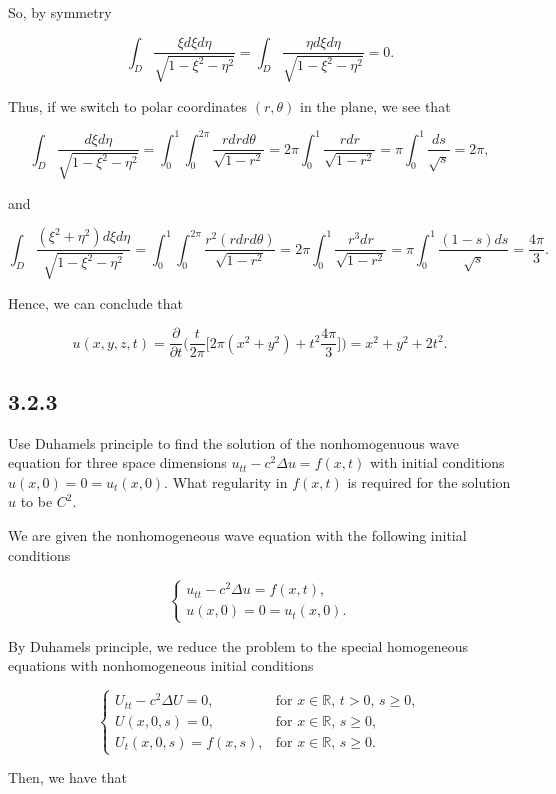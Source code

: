 \documentclass{article}
\begin{document}
So, by symmetry

$$\int_{D}\frac{\xi d\xi d\eta}{\sqrt{1-\xi^2-\eta^2}}=\int_{D}\frac{\eta d\xi d\eta}{\sqrt{1-\xi^2-\eta^2}}=0.$$

Thus, if we switch to polar coordinates $(r,\theta)$ in the plane, we see that

$$\int_{D}\frac{d\xi d\eta}{\sqrt{1-\xi^2-\eta^2}}=\int_0^1\int_0^{2\pi}\frac{rdrd\theta}{\sqrt{1-r^2}}=2\pi\int_0^1\frac{rdr}{\sqrt{1-r^2}}=\pi\int_0^1\frac{ds}{\sqrt{s}}=2\pi,$$

and

$$\int_{D}\frac{(\xi^2+\eta^2) d\xi d\eta}{\sqrt{1-\xi^2-\eta^2}}=\int_0^1\int_0^{2\pi}\frac{r^2(rdrd\theta)}{\sqrt{1-r^2}}=2\pi\int_0^1\frac{r^3dr}{\sqrt{1-r^2}}=\pi\int_0^1\frac{(1-s)ds}{\sqrt{s}}=\frac{4\pi}{3}.$$

Hence, we can conclude that

$$u(x,y,z,t)=\frac{\partial}{\partial t}\Bigg(\frac{t}{2\pi}\Big[2\pi(x^2+y^2)+t^2\frac{4\pi}{3}\Big]\Bigg)=x^2+y^2+2t^2.$$

\subsection{\textbf{3.2.3}} Use Duhamel\textsc{}s principle to find the solution of the nonhomogenuous wave equation for three space dimensions $u_{tt}-c^2\Delta u=f(x,t)$ with initial conditions $u(x,0)=0=u_t(x,0)$. What regularity in $f(x,t)$ is required for the solution $u$ to be $C^2$.

We are given the nonhomogeneous wave equation with the following initial conditions

\[
  \begin{cases}
  u_{tt}-c^2\Delta u=f(x,t), \\
  u(x,0)=0=u_t(x,0).
  \end{cases}
\]

By Duhamel\textsc{}s principle, we reduce the problem to the special homogeneous equations with
nonhomogeneous initial conditions

\[
  \begin{cases}
  U_{tt}-c^2\Delta U=0, &\text{for $x\in\mathbb R$, $t>0$, $s\geq 0$},\\
  U(x,0,s)=0, &\text{for $x\in\mathbb R$, $s\geq 0$},\\
  U_t(x,0,s)=f(x,s), &\text{for $x\in\mathbb R$, $s\geq 0$}.
  \end{cases}
\]

Then, we have that
\end{document}
